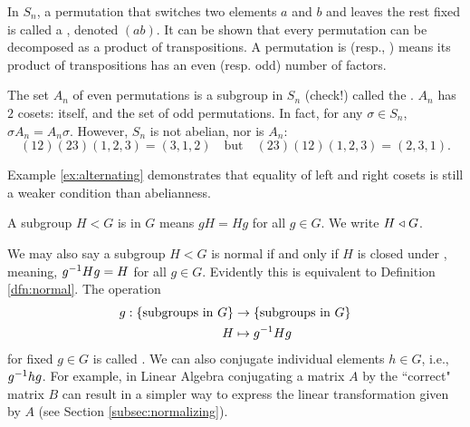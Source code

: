 \documentclass[../algebraNotesMSRI-UP2016.tex]{subfiles}
\begin{document}
\begin{frame}
\begin{ex}\label{ex:alternating}
In $S_n$, a permutation that switches two elements $a$ and $b$ and leaves the rest fixed is called a , denoted $(a b)$.  It can be shown that every permutation can be decomposed as a product of transpositions.  A permutation is  (resp., )  means its product of transpositions has an even (resp. odd) number of factors.  

\smallGap
The set $A_n$ of even permutations is a subgroup in $S_n$ (check!) called the .  $A_n$ has $2$ cosets: itself, and the set of odd permutations.  In fact, for any $\sigma\in S_n$, $\sigma A_n=A_n\sigma$.  However, $S_n$ is not abelian, nor is $A_n$:
\[
(12)(23)\left(1,2,3\right)=(3,1,2)\quad \text{but}\quad (23)(12)\left(1,2,3\right)=(2,3,1).
\]
\end{ex}

\smallGap
Example \ref{ex:alternating} demonstrates that equality of left and right cosets is still a weaker condition than abelianness.
\end{frame}

\begin{frame}
\begin{dfn}\label{dfn:normal}
A subgroup $H<G$ is  in $G$ means $gH=Hg$ for all $g\in G$.  We write $H\mathrel{\triangleleft} G$.
\end{dfn}

\smallGap We may also say a subgroup $H<G$ is normal if and only if $H$ is closed under , meaning, $g^{-1}Hg=H$ for all $g\in G$.  Evidently this is equivalent to Definition \ref{dfn:normal}.  The operation 
\begin{align*}
g:\{\text{subgroups in $G$}\} &\to \{\text{subgroups in $G$}\} \\
 H &\mapsto g^{-1}Hg
\end{align*} 
for fixed $g\in G$ is called .  We can also conjugate individual elements $h\in G$, i.e., $g^{-1}hg$.  For example, in Linear Algebra conjugating a matrix $A$ by the ``correct" matrix $B$ can result in a simpler way to express the linear transformation given by $A$ (see Section \ref{subsec:normalizing}).
\end{frame}
\end{document}
